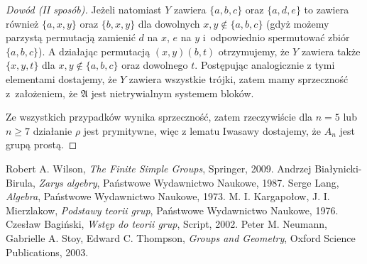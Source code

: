\documentclass[licencjacka]{pracamgr}
\begin{document}
\begin{proof}[Dowód (II sposób)]
  Jeżeli natomiast $Y$ zawiera $\{a, b, c\}$ oraz $\{a, d, e\}$ to zawiera również $\{a, x, y\}$ oraz $\{b, x, y\}$ 
  dla dowolnych $x, y \not \in \{a, b, c\}$ (gdyż możemy parzystą permutacją zamienić $d$ na $x$, $e$ na $y$ i~odpowiednio spermutować zbiór $\{a, b, c\}$).
  A działając permutacją $(x, y)(b, t)$ otrzymujemy, że $Y$ zawiera także $\{x, y, t\}$ dla $x, y \not \in \{a, b, c\}$ oraz dowolnego $t$.
  Postępując analogicznie z tymi elementami dostajemy, że $Y$ zawiera wszystkie trójki, zatem mamy sprzeczność z~założeniem, że 
  $\mathfrak{A}$ jest nietrywialnym systemem bloków.

  Ze wszystkich przypadków wynika sprzeczność, zatem rzeczywiście dla $n = 5$ lub $n \ge 7$ działanie $\rho$ jest prymitywne, 
  więc z lematu Iwasawy dostajemy, że $A_n$ jest grupą prostą.
\end{proof}


\addtocounter{chapter}{2}


\begin{thebibliography}{99}

 Robert A. Wilson, \textit{The Finite Simple Groups}, Springer, 2009.
 Andrzej Białynicki-Birula, \textit{Zarys algebry}, Państwowe Wydawnictwo Naukowe, 1987.
 Serge Lang, \textit{Algebra}, Państwowe Wydawnictwo Naukowe, 1973.
 M. I. Kargapołow, J. I. Mierzlakow, \textit{Podstawy teorii grup}, Państwowe Wydawnictwo Naukowe, 1976.
 Czesław Bagiński, \textit{Wstęp do teorii grup}, Script, 2002.
 Peter M. Neumann, Gabrielle A. Stoy, Edward C. Thompson, \textit{Groups and Geometry}, Oxford Science Publications, 2003.

\end{thebibliography}
\end{document}
